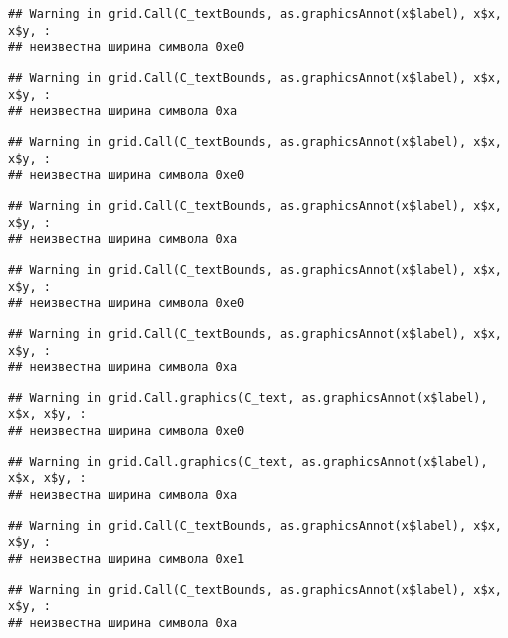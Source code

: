\documentclass[
]{article}
\begin{document}
\begin{verbatim}
## Warning in grid.Call(C_textBounds, as.graphicsAnnot(x$label), x$x, x$y, :
## неизвестна ширина символа 0xe0
\end{verbatim}

\begin{verbatim}
## Warning in grid.Call(C_textBounds, as.graphicsAnnot(x$label), x$x, x$y, :
## неизвестна ширина символа 0xa
\end{verbatim}

\begin{verbatim}
## Warning in grid.Call(C_textBounds, as.graphicsAnnot(x$label), x$x, x$y, :
## неизвестна ширина символа 0xe0
\end{verbatim}

\begin{verbatim}
## Warning in grid.Call(C_textBounds, as.graphicsAnnot(x$label), x$x, x$y, :
## неизвестна ширина символа 0xa
\end{verbatim}

\begin{verbatim}
## Warning in grid.Call(C_textBounds, as.graphicsAnnot(x$label), x$x, x$y, :
## неизвестна ширина символа 0xe0
\end{verbatim}

\begin{verbatim}
## Warning in grid.Call(C_textBounds, as.graphicsAnnot(x$label), x$x, x$y, :
## неизвестна ширина символа 0xa
\end{verbatim}

\begin{verbatim}
## Warning in grid.Call.graphics(C_text, as.graphicsAnnot(x$label), x$x, x$y, :
## неизвестна ширина символа 0xe0
\end{verbatim}

\begin{verbatim}
## Warning in grid.Call.graphics(C_text, as.graphicsAnnot(x$label), x$x, x$y, :
## неизвестна ширина символа 0xa
\end{verbatim}

\begin{verbatim}
## Warning in grid.Call(C_textBounds, as.graphicsAnnot(x$label), x$x, x$y, :
## неизвестна ширина символа 0xe1
\end{verbatim}

\begin{verbatim}
## Warning in grid.Call(C_textBounds, as.graphicsAnnot(x$label), x$x, x$y, :
## неизвестна ширина символа 0xa
\end{verbatim}
\end{document}
